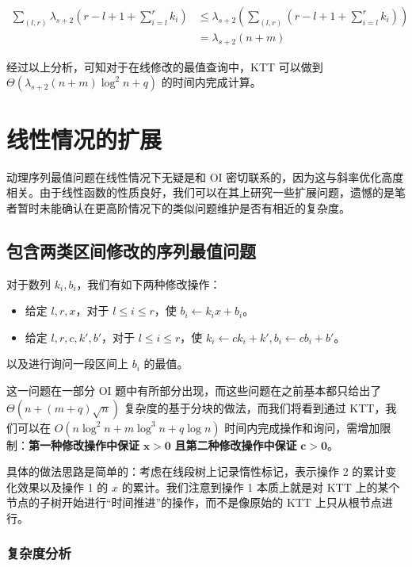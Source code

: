 \documentclass[12pt]{ctexart}
\begin{document}
\begin{align*}
\sum_{(l, r)}\lambda_{s + 2}\left(r - l + 1 + \sum_{i=l}^r k_i\right) & \le \lambda_{s + 2}\left(\sum_{(l, r)} \left(r - l + 1 + \sum_{i=l}^r k_i\right)\right) \\
& = \lambda_{s + 2}(n + m)
\end{align*}

经过以上分析，可知对于在线修改的最值查询中，KTT 可以做到 $\Theta(\lambda_{s + 2}(n + m)\log^2 n + q)$ 的时间内完成计算。

\section{线性情况的扩展}

动理序列最值问题在线性情况下无疑是和 OI 密切联系的，因为这与斜率优化高度相关。由于线性函数的性质良好，我们可以在其上研究一些扩展问题，遗憾的是笔者暂时未能确认在更高阶情况下的类似问题维护是否有相近的复杂度。

\subsection{包含两类区间修改的序列最值问题}

对于数列 $k_i, b_i$，我们有如下两种修改操作：

\begin{itemize}
\item 给定 $l, r, x$，对于 $l\le i\le r$，使 $b_i \leftarrow k_ix + b_i$。
\item 给定 $l, r, c, k', b'$，对于 $l\le i\le r$，使 $k_i \leftarrow ck_i + k', b_i \leftarrow cb_i + b'$。
\end{itemize}

以及进行询问一段区间上 $b_i$ 的最值。

这一问题在一部分 OI 题中有所部分出现，而这些问题在之前基本都只给出了 $\Theta(n + (m + q)\sqrt n)$ 复杂度的基于分块的做法，而我们将看到通过 KTT，我们可以在 $O(n\log^2 n + m\log^3 n + q\log n)$ 时间内完成操作和询问，需增加限制：\textbf{第一种修改操作中保证} $\mathbf{x > 0}$ \textbf{且第二种修改操作中保证} $\mathbf{c > 0}$。

具体的做法思路是简单的：考虑在线段树上记录惰性标记，表示操作 2 的累计变化效果以及操作 1 的 $x$ 的累计。我们注意到操作 1 本质上就是对 KTT 上的某个节点的子树开始进行“时间推进”的操作，而不是像原始的 KTT 上只从根节点进行。

\subsubsection{复杂度分析}
\end{document}
